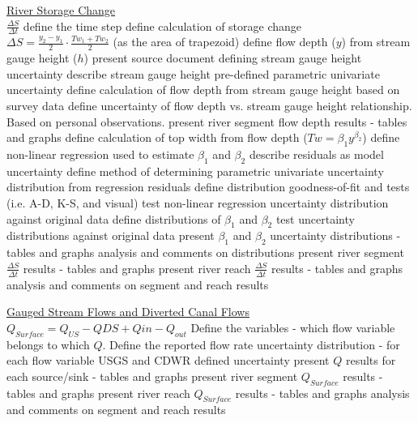 \documentclass[12pt]{article}
\begin{document}
\begin{outline}[enumerate]
		\2 \underline{River Storage Change}\\
			$\frac{\Delta S}{\Delta t}$
			\3 define the time step
			\3 define calculation of storage change\\
			$\Delta S = \frac{y_2-y_1}{2} \cdot \frac{Tw_1+Tw_2}{2}$ (as the area of trapezoid)
			\3 define flow depth ($y$) from stream gauge height ($h$)
				\4 present source document defining stream gauge height uncertainty
				\4 describe stream gauge height pre-defined parametric univariate uncertainty
			\3 define calculation of flow depth from stream gauge height based on survey data
				\4 define uncertainty of flow depth vs. stream gauge height relationship.  Based on personal observations.
				\4 present river segment flow depth results - tables and graphs
			\3 define calculation of top width from flow depth ($Tw=\beta_1 y^{\beta_2}$)
				\4 define non-linear regression used to estimate $\beta_1$ and $\beta_2$
				\4 describe residuals as model uncertainty
				\4 define method of determining parametric univariate uncertainty distribution from regression residuals
				\4 define distribution goodness-of-fit and tests (i.e. A-D, K-S, and visual)
				\4 test non-linear regression uncertainty distribution against original data
				\4 define distributions of $\beta_1$ and $\beta_2$
				\4 test uncertainty distributions against original data
				\4 present $\beta_1$ and $\beta_2$ uncertainty distributions - tables and graphs
				\4 analysis and comments on distributions
			\3 present river segment $\frac{\Delta S}{\Delta t}$ results - tables and graphs
			\3 present river reach $\frac{\Delta S}{\Delta t}$ results - tables and graphs
			\3 analysis and comments on segment and reach results

		\2 \underline{Gauged Stream Flows and Diverted Canal Flows}\\
			 $Q_{Surface} = Q_{US}-Q{DS}+Q{in}-Q_{out}$
			\3 Define the variables - which flow variable belongs to which $Q$.
			\3 Define the reported flow rate uncertainty distribution - for each flow variable
				\4 USGS and CDWR defined uncertainty
			\3 present $Q$ results for each source/sink - tables and graphs
			\3 present river segment $Q_{Surface}$ results - tables and graphs
			\3 present river reach $Q_{Surface}$ results - tables and graphs
			\3 analysis and comments on segment and reach results
		

\end{outline}
\end{document}
